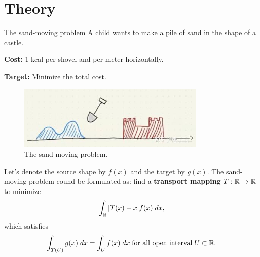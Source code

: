 \section{Theory}

\begin{frame}{The sand-moving problem}
    \footnotesize
    A child wants to make a pile of sand in the shape of a castle.

    \textbf{Cost:} 1 kcal per shovel and per meter horizontally.

    \textbf{Target:} Minimize the total cost.

    \begin{figure}
        \captionsetup{font=scriptsize}
        \centering
        \includegraphics[width=0.8\textwidth]{png/SandMoving.jpg}
        \caption{The sand-moving problem.}
    \end{figure}

    \pause
    Let's denote the source shape by $f(x)$ and the target by $g(x)$. 
    The sand-moving problem cound be formulated as: 
    find a \textbf{transport mapping} $T:\mathbb{R}\to\mathbb{R}$ to minimize
    \begin{equation}
        \int_{\mathbb{R}} |T(x)-x|f(x)\;dx,
    \end{equation}
    which satisfies
    \begin{equation}
        \int_{T(U)} g(x)\;dx = \int_{U} f(x)\;dx\; \text{for all open interval}\; U\subset\mathbb{R}.
    \end{equation}
\end{frame}

